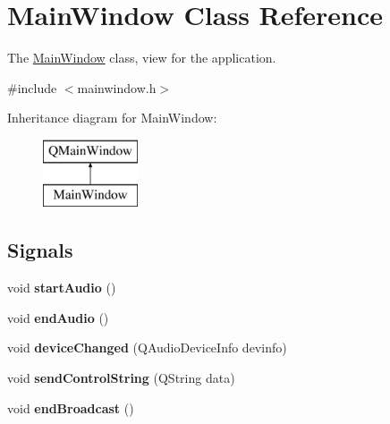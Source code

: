 \hypertarget{class_main_window}{\section{Main\+Window Class Reference}
\label{class_main_window}
}


The \hyperlink{class_main_window}{Main\+Window} class, view for the application.  




{\ttfamily \#include $<$mainwindow.\+h$>$}

Inheritance diagram for Main\+Window\+:\begin{figure}[H]
\begin{center}
\leavevmode
\includegraphics[height=2.000000cm]{class_main_window}
\end{center}
\end{figure}
\subsection*{Signals}
\begin{DoxyCompactItemize}
\item 
\hypertarget{class_main_window_a79ee89a481e69b71e4952b7adac270f7}{void {\bfseries start\+Audio} ()}\label{class_main_window_a79ee89a481e69b71e4952b7adac270f7}

\item 
\hypertarget{class_main_window_a08aaa1bf83576559bd4381a9eb88957d}{void {\bfseries end\+Audio} ()}\label{class_main_window_a08aaa1bf83576559bd4381a9eb88957d}

\item 
\hypertarget{class_main_window_aa29e66c3b8e0c48e0d6ba5df941c37ea}{void {\bfseries device\+Changed} (Q\+Audio\+Device\+Info devinfo)}\label{class_main_window_aa29e66c3b8e0c48e0d6ba5df941c37ea}

\item 
\hypertarget{class_main_window_accdf2b19b399a0c4e5edb079c45dfb4f}{void {\bfseries send\+Control\+String} (Q\+String data)}\label{class_main_window_accdf2b19b399a0c4e5edb079c45dfb4f}

\item 
\hypertarget{class_main_window_a9fab109300b5ff9a8c3a59f782a07d0b}{void {\bfseries end\+Broadcast} ()}\label{class_main_window_a9fab109300b5ff9a8c3a59f782a07d0b}

\end{DoxyCompactItemize}
